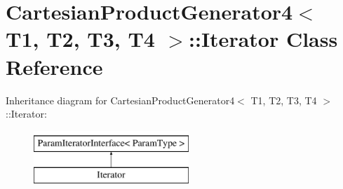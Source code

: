 \hypertarget{classtesting_1_1internal_1_1CartesianProductGenerator4_1_1Iterator}{\section{\-Cartesian\-Product\-Generator4$<$ \-T1, \-T2, \-T3, \-T4 $>$\-:\-:\-Iterator \-Class \-Reference}
\label{d4/db9/classtesting_1_1internal_1_1CartesianProductGenerator4_1_1Iterator}
}
\-Inheritance diagram for \-Cartesian\-Product\-Generator4$<$ \-T1, \-T2, \-T3, \-T4 $>$\-:\-:\-Iterator\-:\begin{figure}[H]
\begin{center}
\leavevmode
\includegraphics[height=2.000000cm]{d4/db9/classtesting_1_1internal_1_1CartesianProductGenerator4_1_1Iterator}
\end{center}
\end{figure}
